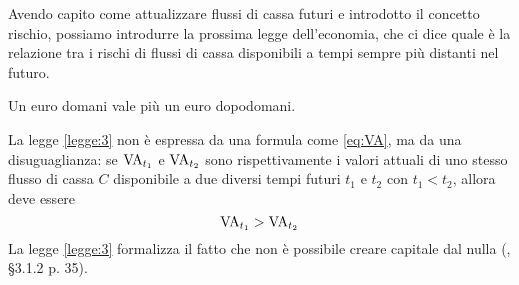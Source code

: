 Avendo capito come attualizzare flussi di cassa futuri e introdotto il concetto rischio, possiamo introdurre
la prossima legge dell'economia, che ci dice quale è la relazione tra i rischi di flussi di cassa disponibili
a tempi sempre più distanti nel futuro.

\begin{legge}\label{legge:3}
  Un euro domani vale più un euro dopodomani.
\end{legge}
La legge \ref{legge:3} non è espressa da una formula come \eqref{eq:VA}, ma da una disuguaglianza:
se $\mathrm{VA}_{t_1}$ e $\mathrm{VA}_{t_2}$ sono rispettivamente i valori attuali di uno stesso flusso di cassa $C$
disponibile a due diversi tempi futuri $t_1$ e $t_2$ con $t_1<t_2$, allora deve essere
\begin{equation}
  \label{eq:legge2}
  \mathrm{VA}_{t_1}>\mathrm{VA}_{t_2}
\end{equation}
La legge \ref{legge:3} formalizza il fatto che non è possibile creare capitale dal nulla (\cite{brealey_et_al1999},
§3.1.2 p. 35).